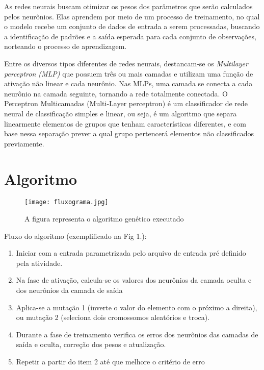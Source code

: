 \documentclass[runningheads]{llncs}
\begin{document}
As redes neurais buscam otimizar os pesos dos parâmetros que serão calculados pelos neurônios. Elas aprendem por meio de um processo de treinamento, no qual o modelo recebe um conjunto de dados de entrada a serem processadas, buscando a identificação de padrões e a saída esperada para cada conjunto de observações, norteando o processo de aprendizagem. \cite{M}

Entre os diversos tipos diferentes de redes neurais, destancam-se os \textit{Multilayer perceptron (MLP)} que possuem três ou mais camadas e utilizam uma função de ativação não linear e cada neurônio. Nas MLPs, uma camada se conecta a cada neurônio na camada seguinte, tornando a rede totalmente conectada.  \cite{M} 
O Perceptron Multicamadas (Multi-Layer perceptron) é um classificador de rede neural de classificação simples e linear, ou seja, é um algoritmo que separa linearmente elementos de grupos que tenham características diferentes, e com base nessa separação prever a qual grupo pertencerá elementos não classificados previamente.

\section{Algoritmo}

\begin{figure}
\begin{center}
\texttt{[image: fluxograma.jpg]}
\end{center}
\caption{A figura representa o algoritmo genético executado} \label{fig1}
\end{figure}

Fluxo do algoritmo (exemplificado na Fig 1.):
\begin{enumerate}
	\item Iniciar com a entrada parametrizada pelo arquivo de entrada pré definido pela atividade.
	\item Na fase de ativação, calcula-se os valores dos neurônios da camada oculta e dos neurônios da camada de saída
	\item Aplica-se a mutação 1 (inverte o valor do elemento com o próximo a direita), ou mutação 2 (seleciona dois cromossomos aleatórios e troca).
	\item Durante a fase de treinamento verifica os erros dos neurônios das camadas de saída e oculta, correção dos pesos e atualização.
	\item Repetir a partir do item 2 até que melhore o critério de erro
\end{enumerate}
\end{document}
